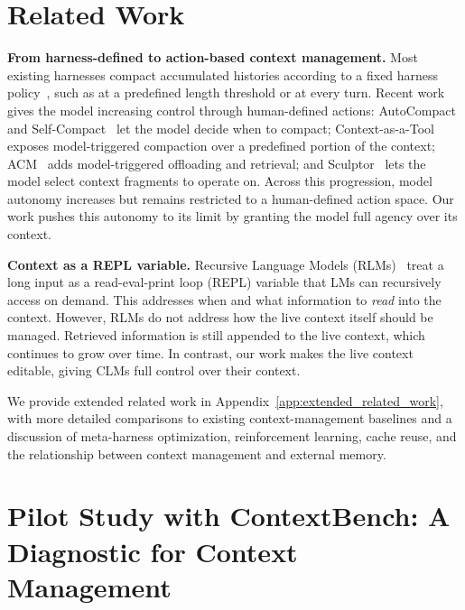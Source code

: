 \documentclass{fairmeta}
\newcommand{\oursplural}{CLMs\xspace}
\newcommand{\ourbench}{ContextBench\xspace}
\begin{document}
\section{Related Work}
\label{sec:related_work}

\textbf{From harness-defined to action-based context management.}
Most existing harnesses
compact accumulated histories according to a fixed harness policy~\citep{cassano2026trainingcomposer,openai2026codex,merrill2026terminal,zhou2026mem1}, such as at a predefined length threshold or at every turn.
Recent work gives the model increasing control through human-defined actions:
AutoCompact~\citep{zhang2026autocompact} and Self-Compact~\citep{li2026self} let the model decide when to compact; Context-as-a-Tool~\citep{liu2026context} exposes model-triggered compaction over a predefined portion of the context;
ACM~\citep{li2026acm} adds model-triggered offloading and retrieval; and Sculptor~\citep{li2026sculptor} lets the model select context fragments to operate on.
Across this progression, model autonomy increases but remains restricted to a human-defined action space.
Our work pushes this autonomy to its limit by granting the model full agency over its context.

\textbf{Context as a REPL variable.}
Recursive Language Models (RLMs)~\citep{zhang2025recursive} 
treat a long input as a read-eval-print loop (REPL) variable that LMs can recursively access on demand. 
This addresses when and what information to \textit{read} into the context. 
However, RLMs do not address how the live context itself should be managed. Retrieved information is still appended to the live context, which continues to grow over time.
In contrast, our work makes the live context editable, giving \oursplural full control over their context.

We provide extended related work in Appendix~\ref{app:extended_related_work}, with more detailed comparisons to existing context-management baselines and a discussion of meta-harness optimization, reinforcement learning, cache reuse, and the relationship between context management and external memory.

\section{Pilot Study with \ourbench: A Diagnostic for Context Management}
\end{document}
